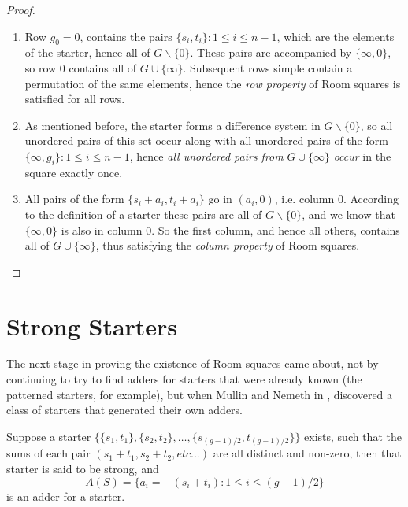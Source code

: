 \begin{proof}
\begin{enumerate}
  \item{Row $g_0 = 0$, contains the pairs
      $\{s_i, t_i\}:1 \leq i \leq n-1$,
      which are the elements of the starter,
      hence all of $G \backslash \{0\}$. These pairs are
      accompanied by $\{\infty, 0\}$, so row 0 contains all
      of $G \cup \{\infty\}$. Subsequent rows simple
      contain a permutation of the same elements, hence
      the \emph{row property} of Room squares is satisfied for
      all rows.}
  \item{As mentioned before, the starter forms a difference
      system in $G \backslash \{0\}$, so all unordered
      pairs of this set occur along with all unordered
      pairs of the form
      $\{\infty, g_i\}: 1 \leq i \leq n - 1$,
      hence \emph{all unordered pairs from}
      $G \cup \{\infty\}$ \emph{occur} in the square exactly once.}
  \item{All pairs of the form $\{s_i + a_i, t_i + a_i\}$ go in
      $(a_i, 0)$, i.e. column 0. According to the
      definition of a starter these pairs are all of $G
      \backslash \{0\}$, and we know that $\{\infty,0\}$
      is also in column 0. So the first column, and hence
      all others, contains all of $G \cup \{\infty\}$,
      thus satisfying the \emph{column property} of Room
      squares.}
\end{enumerate}
\end{proof}

\section{Strong Starters}
\label{sec:strong-starters}

The next stage in proving the existence of Room squares came about, not by continuing to try to find adders for starters that were already known (the patterned starters, for example), but when Mullin and Nemeth in
\cite{mullinFurnishingRoomSquares1969},
discovered a class of starters that generated their own adders.

\begin{theorem}
\label{thm:furnishing}
Suppose a starter
$\{\{s_1, t_1\}, \{s_2, t_2\}, \ldots, \{s_{(g - 1)/2}, t_{(g - 1)/2}\}\}$
exists, such that the sums of each pair
$(s_1 + t_1, s_2 + t_2, etc...)$
are all distinct and non-zero, then that starter is said to be strong, and
\begin{equation}
 A(S) = \{a_i = -(s_i + t_i):1 \leq i \leq (g - 1)/2\}
\end{equation}
is an adder for a starter.
\end{theorem}

